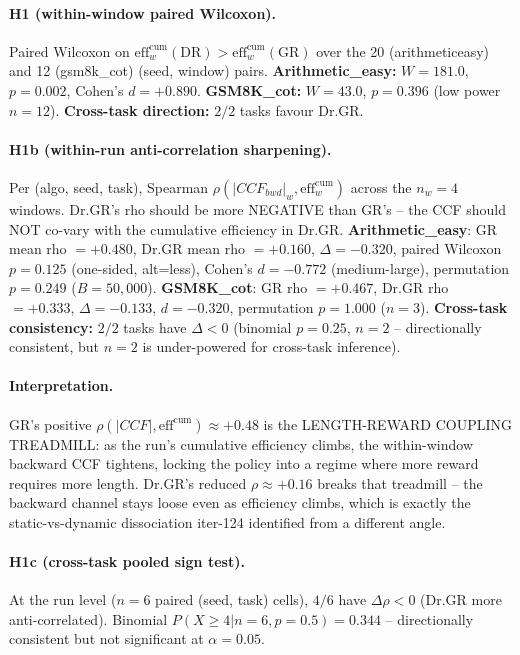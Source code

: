 \paragraph{H1 (within-window paired Wilcoxon).}
Paired Wilcoxon on $\mathrm{eff}^{\mathrm{cum}}_w(\mathrm{DR}) >
\mathrm{eff}^{\mathrm{cum}}_w(\mathrm{GR})$ over the 20
(arithmeticeasy) and 12 (gsm8k\_cot) (seed, window) pairs.
\textbf{Arithmetic\_easy:} $W=181.0$, $p=0.002$, Cohen's $d=+0.890$.
\textbf{GSM8K\_cot:} $W=43.0$, $p=0.396$ (low power $n{=}12$).
\textbf{Cross-task direction:} $2/2$ tasks favour Dr.GR.

\paragraph{H1b (within-run anti-correlation sharpening).}
Per (algo, seed, task), Spearman
$\rho(|CCF_{bwd}|_w, \mathrm{eff}^{\mathrm{cum}}_w)$ across the
$n_w=4$ windows.  Dr.GR's rho should be more NEGATIVE than GR's --
the CCF should NOT co-vary with the cumulative efficiency in Dr.GR.
\textbf{Arithmetic\_easy}: GR mean rho $= +0.480$, Dr.GR mean rho $= +0.160$,
$\Delta = -0.320$, paired Wilcoxon $p=0.125$ (one-sided, alt=less),
Cohen's $d=-0.772$ (medium-large), permutation $p=0.249$ ($B=50{,}000$).
\textbf{GSM8K\_cot}: GR rho $= +0.467$, Dr.GR rho $= +0.333$,
$\Delta = -0.133$, $d=-0.320$, permutation $p=1.000$ ($n{=}3$).
\textbf{Cross-task consistency:} $2/2$ tasks have $\Delta < 0$
(binomial $p=0.25$, $n=2$ -- directionally consistent, but
$n=2$ is under-powered for cross-task inference).

\paragraph{Interpretation.}
GR's positive $\rho(|CCF|, \mathrm{eff}^{\mathrm{cum}})\approx +0.48$
is the LENGTH-REWARD COUPLING TREADMILL: as the run's cumulative
efficiency climbs, the within-window backward CCF tightens, locking
the policy into a regime where more reward requires more length.
Dr.GR's reduced $\rho\approx +0.16$ breaks that treadmill -- the
backward channel stays loose even as efficiency climbs, which is
exactly the static-vs-dynamic dissociation iter-124 identified from
a different angle.

\paragraph{H1c (cross-task pooled sign test).}
At the run level ($n=6$ paired (seed, task) cells), $4/6$ have
$\Delta\rho<0$ (Dr.GR more anti-correlated).  Binomial
$P(X\ge 4 | n=6, p=0.5)=0.344$ -- directionally consistent but
not significant at $\alpha=0.05$.

